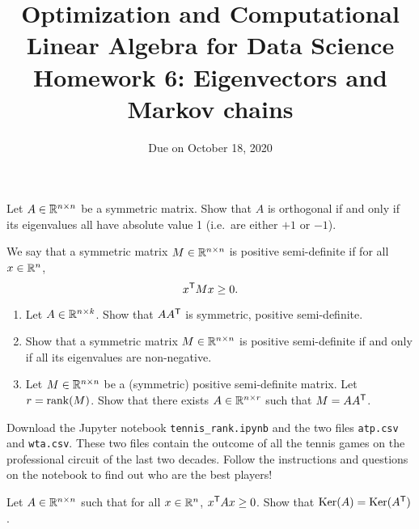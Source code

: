 \documentclass[11pt,nocut]{article}
\title{\vspace{-2.0cm}%
	Optimization and Computational Linear Algebra for Data Science\\
Homework 6: Eigenvectors and Markov chains}
\date{\vspace{-1cm}Due on October 18, 2020}
\begin{document}
\maketitle




\begin{problem}[2 points]
	Let $A \in \mathbb{R}^{n \times n}$ be a symmetric matrix. Show that $A$ is orthogonal if and only if its eigenvalues all have absolute value 1 (i.e.\ are either $+1$ or $-1$).
\end{problem}

\vspace{1mm}

\begin{problem}[3 points]
	We say that a symmetric matrix $M \in \mathbb{R}^{n \times n}$ is positive semi-definite if for all $x \in \mathbb{R}^n$,
	$$
	x^{{\sf T}} M x \geq 0.
	$$
	\begin{enumerate}[label=\normalfont(\textbf{\alph*})]
		\item Let $A \in \mathbb{R}^{n \times k}$. Show that $A A^{{\sf T}}$ is symmetric, positive semi-definite.
		\item Show that a symmetric matrix $M \in \mathbb{R}^{n \times n}$ is positive semi-definite if and only if all its eigenvalues are non-negative.
		\item Let $M \in \mathbb{R}^{n \times n}$ be a (symmetric) positive semi-definite matrix. Let $r = {{\rm rank}}(M)$. Show that there exists $A \in \mathbb{R}^{n \times r}$ such that $M = AA^{{\sf T}}$.
	\end{enumerate}
	
\end{problem}

\vspace{1mm}


\begin{problem}[5 points]
	Download the Jupyter notebook \texttt{tennis\_rank.ipynb} and the two files \texttt{atp.csv} and \texttt{wta.csv}. These two files contain the outcome of all the tennis games on the professional circuit of the last two decades.
	Follow the instructions and questions on the notebook to find out who are the best players!
\end{problem}


\vspace{1mm}




\begin{problem}[$\star$]
	Let $A \in \mathbb{R}^{n \times n}$ such that for all $x \in \mathbb{R}^n$, $x^{{\sf T}} A x \geq 0$. Show that ${{\rm Ker}}(A) = {{\rm Ker}}(A^{{\sf T}})$.
\end{problem}
\vspace{1cm}
\centerline{}

%
%
\end{document}
